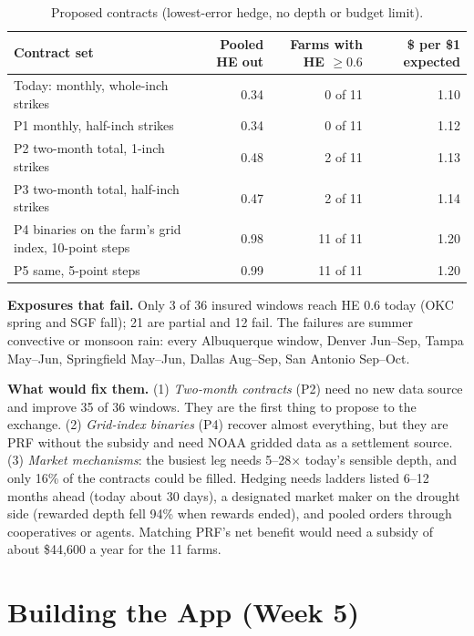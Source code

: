 \documentclass[11pt]{article}
\begin{document}
\begin{table}[H]\centering\small
\begin{tabularx}{\textwidth}{Yrrr}
\toprule
Contract set & Pooled HE out & Farms with HE $\ge 0.6$ & \$ per \$1 expected \\
\midrule
Today: monthly, whole-inch strikes & 0.34 & 0 of 11 & 1.10 \\
P1 monthly, half-inch strikes & 0.34 & 0 of 11 & 1.12 \\
P2 two-month total, 1-inch strikes & 0.48 & 2 of 11 & 1.13 \\
P3 two-month total, half-inch strikes & 0.47 & 2 of 11 & 1.14 \\
P4 binaries on the farm's grid index, 10-point steps & 0.98 & 11 of 11 & 1.20 \\
P5 same, 5-point steps & 0.99 & 11 of 11 & 1.20 \\
\bottomrule
\end{tabularx}
\caption{Proposed contracts (lowest-error hedge, no depth or budget limit).}
\end{table}

\textbf{Exposures that fail.} Only 3 of 36 insured windows reach HE 0.6 today (OKC spring and SGF fall);
21 are partial and 12 fail. The failures are summer convective or monsoon rain: every Albuquerque window,
Denver Jun--Sep, Tampa May--Jun, Springfield May--Jun, Dallas Aug--Sep, San Antonio Sep--Oct.

\textbf{What would fix them.} (1) \emph{Two-month contracts} (P2) need no new data source and improve 35 of 36
windows. They are the first thing to propose to the exchange. (2) \emph{Grid-index binaries} (P4) recover
almost everything, but they are PRF without the subsidy and need NOAA gridded data as a settlement source.
(3) \emph{Market mechanisms}: the busiest leg needs 5--28$\times$ today's sensible depth, and only 16\% of the
contracts could be filled. Hedging needs ladders listed 6--12 months ahead (today about 30 days), a
designated market maker on the drought side (rewarded depth fell 94\% when rewards ended), and pooled
orders through cooperatives or agents. Matching PRF's net benefit would need a subsidy of about \$44,600 a
year for the 11 farms.

\section{Building the App (Week 5)}
\end{document}
